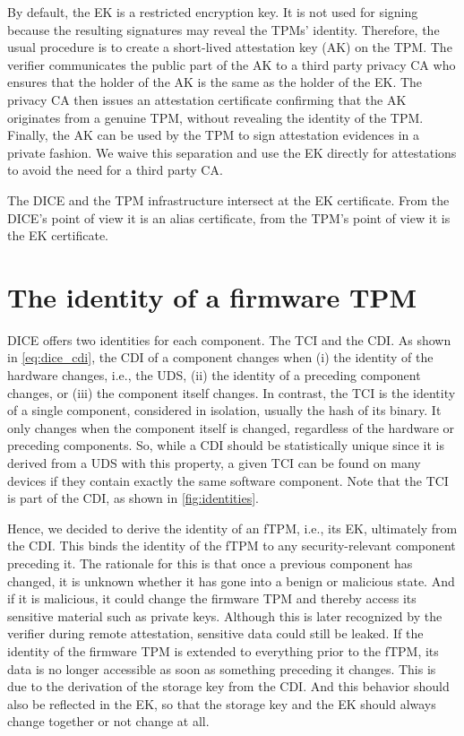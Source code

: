 
By default, the EK is a restricted encryption key.
It is not used for signing because the resulting signatures may reveal the TPMs' identity.
Therefore, the usual procedure is to create a short-lived attestation key (AK) on the TPM\@.
The verifier communicates the public part of the AK to a third party privacy CA who ensures that the holder of the AK is the same as the holder of the EK\@.
The privacy CA then issues an attestation certificate confirming that the AK originates from a genuine TPM, without revealing the identity of the TPM\@.
Finally, the AK can be used by the TPM to sign attestation evidences in a private fashion.
We waive this separation and use the EK directly for attestations to avoid the need for a third party CA\@.


The DICE and the TPM infrastructure intersect at the EK certificate.
From the DICE's point of view it is an alias certificate, from the TPM's point of view it is the EK certificate.

\section{The identity of a firmware TPM}

DICE offers two identities for each component.
The TCI and the CDI\@.
As shown in \autoref{eq:dice_cdi}, the CDI of a component changes when (i) the identity of the hardware changes, i.e., the UDS, (ii) the identity of a preceding component changes, or (iii) the component itself changes.
In contrast, the TCI is the identity of a single component, considered in isolation, usually the hash of its binary.
It only changes when the component itself is changed, regardless of the hardware or preceding components.
So, while a CDI should be statistically unique since it is derived from a UDS with this property, a given TCI can be found on many devices if they contain exactly the same software component.
Note that the TCI is part of the CDI, as shown in \autoref{fig:identities}.



Hence, we decided to derive the identity of an fTPM, i.e., its EK, ultimately from the CDI\@.
This binds the identity of the fTPM to any security-relevant component preceding it.
The rationale for this is that once a previous component has changed, it is unknown whether it has gone into a benign or malicious state.
And if it is malicious, it could change the firmware TPM and thereby access its sensitive material such as private keys.
Although this is later recognized by the verifier during remote attestation, sensitive data could still be leaked.
If the identity of the firmware TPM is extended to everything prior to the fTPM, its data is no longer accessible as soon as something preceding it changes.
This is due to the derivation of the storage key from the CDI\@.
And this behavior should also be reflected in the EK, so that the storage key and the EK should always change together or not change at all.

